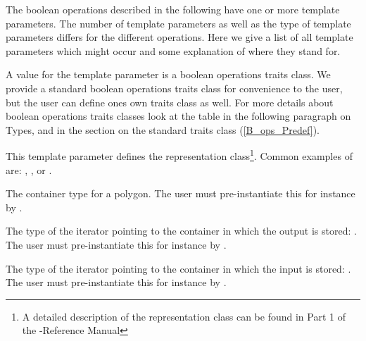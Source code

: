 \ccParameters
The boolean operations described in the following have one or more
template parameters. The number of template parameters as well as the
type of template parameters differs for the different operations.
Here we give a list of all template parameters which might occur
and some explanation of where they stand for.



A value for the template parameter  is a
boolean operations traits class. We provide a standard boolean
operations traits class for convenience to the user, but the user
can define ones own traits class as well. For more details about 
boolean operations traits classes look at the table in the following paragraph
on Types, and in the section on the standard traits class
(\ref{B_ops_Predef}). 



This template parameter defines the  representation class\footnote{
A detailed description of the representation class can
be found in Part 1 of the \cgal-Reference Manual}.
Common examples of   are:
,
, or
. 


The container type  for a polygon.  
The user must pre-instantiate this for instance by
.



The type of the iterator pointing to the container in which the output
is stored: . The user must 
pre-instantiate this for instance by
.



The type of the iterator pointing to the container in which the 
input is stored: . The user must 
pre-instantiate this for instance by
.




